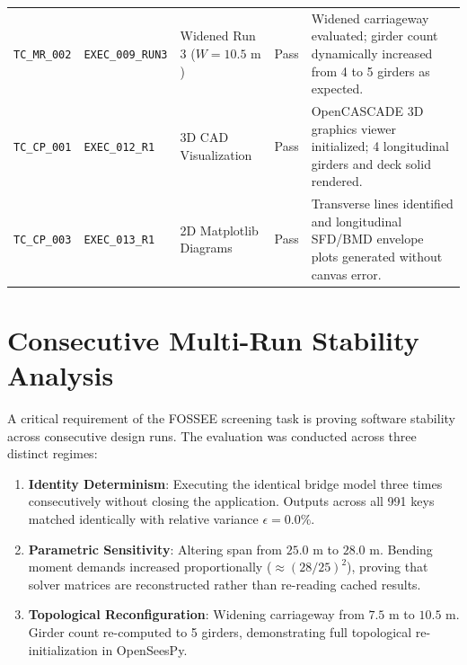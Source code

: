\begin{table}[htbp]
\begin{tabularx}{\textwidth}{llllX}
        \texttt{TC\_MR\_002} & \texttt{EXEC\_009\_RUN3} & Widened Run 3 ($W=10.5\text{ m}$) & Pass & Widened carriageway evaluated; girder count dynamically increased from 4 to 5 girders as expected. \\
        \texttt{TC\_CP\_001} & \texttt{EXEC\_012\_R1} & 3D CAD Visualization & Pass & OpenCASCADE 3D graphics viewer initialized; 4 longitudinal girders and deck solid rendered. \\
        \texttt{TC\_CP\_003} & \texttt{EXEC\_013_R1} & 2D Matplotlib Diagrams & Pass & Transverse lines identified and longitudinal SFD/BMD envelope plots generated without canvas error. \\
        \bottomrule
    \end{tabularx}
\end{table}

\section{Consecutive Multi-Run Stability Analysis}
A critical requirement of the FOSSEE screening task is proving software stability across consecutive design runs. The evaluation was conducted across three distinct regimes:
\begin{enumerate}
    \item \textbf{Identity Determinism}: Executing the identical bridge model three times consecutively without closing the application. Outputs across all 991 keys matched identically with relative variance $\epsilon = 0.0\%$.
    \item \textbf{Parametric Sensitivity}: Altering span from $25.0\text{ m}$ to $28.0\text{ m}$. Bending moment demands increased proportionally ($\approx (28/25)^2$), proving that solver matrices are reconstructed rather than re-reading cached results.
    \item \textbf{Topological Reconfiguration}: Widening carriageway from $7.5\text{ m}$ to $10.5\text{ m}$. Girder count re-computed to 5 girders, demonstrating full topological re-initialization in OpenSeesPy.
\end{enumerate}
